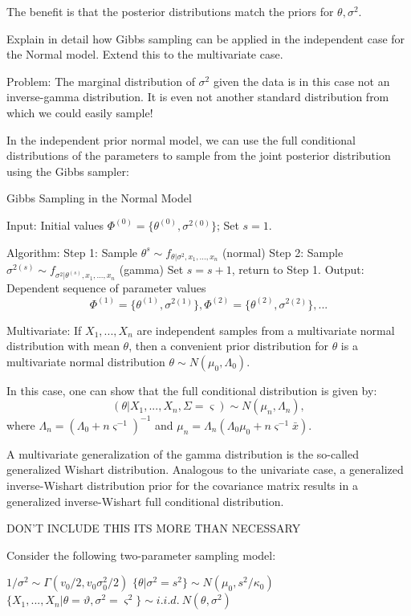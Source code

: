 The benefit is that the posterior distributions match the priors for \( \theta, \sigma^2 \).



Explain in detail how Gibbs sampling can be applied
in the independent case for the Normal model. Extend this to the multivariate case.


Problem:
The marginal distribution of \( \sigma^2 \) given the data is in this case not an inverse-gamma distribution.
It is even not another standard distribution from which we could easily sample!

In the independent prior normal model, we can use the full conditional distributions of the parameters to sample from the 
joint posterior distribution using the Gibbs sampler:

Gibbs Sampling in the Normal Model

Input: Initial values \(\Phi^{(0)} = \{\theta^{(0)}, \sigma^{2(0)}\}\); Set \(s = 1\).

Algorithm:
Step 1: Sample \(\theta^{s} \sim f_{\theta | \sigma^2, x_1,...,x_n}\) (normal)
Step 2: Sample \(\sigma^{2(s)} \sim f_{\sigma^2 | \theta^{(s)}, x_1,...,x_n}\) (gamma)
Set \(s = s + 1\), return to Step 1.
Output: Dependent sequence of parameter values
\[
\Phi^{(1)} = \{\theta^{(1)}, \sigma^{2(1)}\}, \Phi^{(2)} = \{\theta^{(2)}, \sigma^{2(2)}\}, ...
\]

Multivariate:
If \(X_1,...,X_n\) are independent samples from a multivariate normal distribution with mean \(\theta\), then a convenient prior distribution for 
\(\theta\) is a multivariate normal distribution \(\theta \sim N(\mu_0, \Lambda_0)\).

In this case, one can show that the full conditional distribution is given by:
\[
(\theta | X_1,...,X_n, \Sigma = \varsigma) \sim N(\mu_n, \Lambda_n),
\]
where \(\Lambda_n = (\Lambda_0 + n\varsigma^{-1})^{-1}\) and \(\mu_n = \Lambda_n (\Lambda_0 \mu_0 + n\varsigma^{-1}\bar{x})\).

A multivariate generalization of the gamma distribution is the so-called generalized Wishart distribution. 
Analogous to the univariate case, a generalized inverse-Wishart distribution prior for the covariance matrix results in a 
generalized inverse-Wishart full conditional distribution.


DON'T INCLUDE THIS ITS MORE THAN NECESSARY

\iffalse
Consider the following two-parameter sampling model:

\( 1/\sigma^2 \sim \Gamma(v_0/2, v_0\sigma_0^2/2) \)
\( \{\theta | \sigma^2 = s^2 \} \sim N(\mu_0, s^2/\kappa_0) \)
\( \{X_1, ..., X_n | \theta = \vartheta, \sigma^2 = \varsigma^2 \} \sim i.i.d. \ N(\theta, \sigma^2) \)

